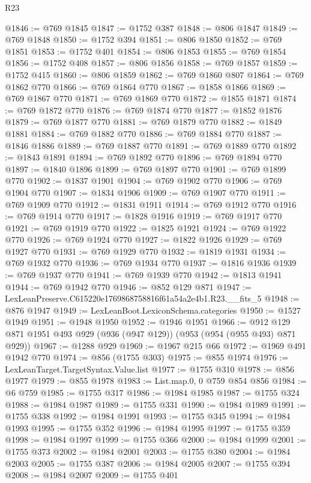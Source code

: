 \begin{lexlean}{R23}
\begin{coremodule}
@1846 := @769 @1845
@1847 := @1752 @387
@1848 := @806 @1847
@1849 := @769 @1848
@1850 := @1752 @394
@1851 := @806 @1850
@1852 := @769 @1851
@1853 := @1752 @401
@1854 := @806 @1853
@1855 := @769 @1854
@1856 := @1752 @408
@1857 := @806 @1856
@1858 := @769 @1857
@1859 := @1752 @415
@1860 := @806 @1859
@1862 := @769 @1860 @807
@1864 := @769 @1862 @770
@1866 := @769 @1864 @770
@1867 := @1858 @1866
@1869 := @769 @1867 @770
@1871 := @769 @1869 @770
@1872 := @1855 @1871
@1874 := @769 @1872 @770
@1876 := @769 @1874 @770
@1877 := @1852 @1876
@1879 := @769 @1877 @770
@1881 := @769 @1879 @770
@1882 := @1849 @1881
@1884 := @769 @1882 @770
@1886 := @769 @1884 @770
@1887 := @1846 @1886
@1889 := @769 @1887 @770
@1891 := @769 @1889 @770
@1892 := @1843 @1891
@1894 := @769 @1892 @770
@1896 := @769 @1894 @770
@1897 := @1840 @1896
@1899 := @769 @1897 @770
@1901 := @769 @1899 @770
@1902 := @1837 @1901
@1904 := @769 @1902 @770
@1906 := @769 @1904 @770
@1907 := @1834 @1906
@1909 := @769 @1907 @770
@1911 := @769 @1909 @770
@1912 := @1831 @1911
@1914 := @769 @1912 @770
@1916 := @769 @1914 @770
@1917 := @1828 @1916
@1919 := @769 @1917 @770
@1921 := @769 @1919 @770
@1922 := @1825 @1921
@1924 := @769 @1922 @770
@1926 := @769 @1924 @770
@1927 := @1822 @1926
@1929 := @769 @1927 @770
@1931 := @769 @1929 @770
@1932 := @1819 @1931
@1934 := @769 @1932 @770
@1936 := @769 @1934 @770
@1937 := @1816 @1936
@1939 := @769 @1937 @770
@1941 := @769 @1939 @770
@1942 := @1813 @1941
@1944 := @769 @1942 @770
@1946 := @852 @129 @871
@1947 := LexLeanPreserve.C615220e1769868758816f61a54a2e4b1.R23.__fits_5
@1948 := @876 @1947
@1949 := LexLeanBoot.LexiconSchema.categories
@1950 := @1527 @1949
@1951 := @1948 @1950
@1952 := @1946 @1951
@1966 := @912 @129 @871 @1951 @493 @929 (@936 (@947 @129)) (@953 (@954 (@955 @493) @871 @929))
@1967 := @1288 @929
@1969 := @1967 @215 @66
@1972 := @1969 @491 @1942 @770
@1974 := @856 (@1755 @303)
@1975 := @855 @1974
@1976 := LexLeanTarget.TargetSyntax.Value.list
@1977 := @1755 @310
@1978 := @856 @1977
@1979 := @855 @1978
@1983 := List.map.{0, 0} @759 @854 @856
@1984 := @6 @759
@1985 := @1755 @317
@1986 := @1984 @1985
@1987 := @1755 @324
@1988 := @1984 @1987
@1989 := @1755 @331
@1990 := @1984 @1989
@1991 := @1755 @338
@1992 := @1984 @1991
@1993 := @1755 @345
@1994 := @1984 @1993
@1995 := @1755 @352
@1996 := @1984 @1995
@1997 := @1755 @359
@1998 := @1984 @1997
@1999 := @1755 @366
@2000 := @1984 @1999
@2001 := @1755 @373
@2002 := @1984 @2001
@2003 := @1755 @380
@2004 := @1984 @2003
@2005 := @1755 @387
@2006 := @1984 @2005
@2007 := @1755 @394
@2008 := @1984 @2007
@2009 := @1755 @401

\end{coremodule}
\end{lexlean}
